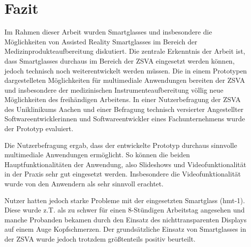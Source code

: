 %
%
%
%
%
%
\chapter{Fazit}
\label{ch:Fazit}

Im Rahmen dieser Arbeit wurden Smartglasses und insbesondere die Möglichkeiten von Assisted Reality Smartglasses im Bereich der Medizinprodukteaufbereitung diskutiert. Die zentrale Erkenntnis der Arbeit ist, dass Smartglasses durchaus im Bereich der ZSVA eingesetzt werden können, jedoch technisch noch weiterentwickelt werden müssen. Die in einem Prototypen dargestelleten Möglichkeiten für multimediale Anwendungen bereiten der ZSVA und insbesondere der medizinischen Instrumenteaufbereitung völlig neue Möglichkeiten des freihändigen Arbeitens. In einer Nutzerbefragung der ZSVA des Uniklinikums Aachen und einer Befragung technisch versierter Angestellter Softwareentwicklerinnen und Softwareentwickler eines Fachunternehmens wurde der Prototyp evaluiert.

Die Nutzerbefragung ergab, dass der entwickelte Prototyp durchaus sinnvolle multimediale Anwendungen ermöglicht. So können die beiden Hauptfunktionalitäten der Anwendung, also Slideshows und Videofunktionalität in der Praxis sehr gut eingesetzt werden. Insbesondere die Videofunktionalität wurde von den Anwendern als sehr sinnvoll erachtet. 

Nutzer hatten jedoch starke Probleme mit der eingesetzten Smartglass (hmt-1). Diese wurde z.T. als zu schwer für einen 8-Stündigen Arbeitstag angesehen und manche Probanden bekamen durch den Einsatz des nichttransparenten Displays auf einem Auge Kopfschmerzen. Der grundsätzliche Einsatz von Smartglasses in der ZSVA wurde jedoch trotzdem größtenteils positiv beurteilt.
%
